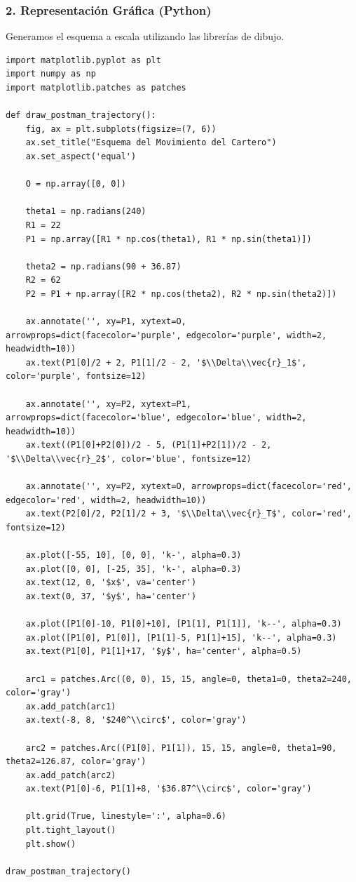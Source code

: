 \documentclass[12pt, a4paper]{article}
\begin{document}
\subsubsection*{2. Representación Gráfica (Python)}
Generamos el esquema a escala utilizando las librerías de dibujo.

\begin{lstlisting}
import matplotlib.pyplot as plt
import numpy as np
import matplotlib.patches as patches

def draw_postman_trajectory():
    fig, ax = plt.subplots(figsize=(7, 6))
    ax.set_title("Esquema del Movimiento del Cartero")
    ax.set_aspect('equal')
    
    O = np.array([0, 0])
    
    theta1 = np.radians(240)
    R1 = 22
    P1 = np.array([R1 * np.cos(theta1), R1 * np.sin(theta1)])
    
    theta2 = np.radians(90 + 36.87) 
    R2 = 62
    P2 = P1 + np.array([R2 * np.cos(theta2), R2 * np.sin(theta2)])

    ax.annotate('', xy=P1, xytext=O, arrowprops=dict(facecolor='purple', edgecolor='purple', width=2, headwidth=10))
    ax.text(P1[0]/2 + 2, P1[1]/2 - 2, '$\\Delta\\vec{r}_1$', color='purple', fontsize=12)

    ax.annotate('', xy=P2, xytext=P1, arrowprops=dict(facecolor='blue', edgecolor='blue', width=2, headwidth=10))
    ax.text((P1[0]+P2[0])/2 - 5, (P1[1]+P2[1])/2 - 2, '$\\Delta\\vec{r}_2$', color='blue', fontsize=12)

    ax.annotate('', xy=P2, xytext=O, arrowprops=dict(facecolor='red', edgecolor='red', width=2, headwidth=10))
    ax.text(P2[0]/2, P2[1]/2 + 3, '$\\Delta\\vec{r}_T$', color='red', fontsize=12)

    ax.plot([-55, 10], [0, 0], 'k-', alpha=0.3)
    ax.plot([0, 0], [-25, 35], 'k-', alpha=0.3)
    ax.text(12, 0, '$x$', va='center')
    ax.text(0, 37, '$y$', ha='center')

    ax.plot([P1[0]-10, P1[0]+10], [P1[1], P1[1]], 'k--', alpha=0.3)
    ax.plot([P1[0], P1[0]], [P1[1]-5, P1[1]+15], 'k--', alpha=0.3)
    ax.text(P1[0], P1[1]+17, '$y$', ha='center', alpha=0.5)

    arc1 = patches.Arc((0, 0), 15, 15, angle=0, theta1=0, theta2=240, color='gray')
    ax.add_patch(arc1)
    ax.text(-8, 8, '$240^\\circ$', color='gray')

    arc2 = patches.Arc((P1[0], P1[1]), 15, 15, angle=0, theta1=90, theta2=126.87, color='gray')
    ax.add_patch(arc2)
    ax.text(P1[0]-6, P1[1]+8, '$36.87^\\circ$', color='gray')

    plt.grid(True, linestyle=':', alpha=0.6)
    plt.tight_layout()
    plt.show()

draw_postman_trajectory()
\end{lstlisting}
\end{document}
